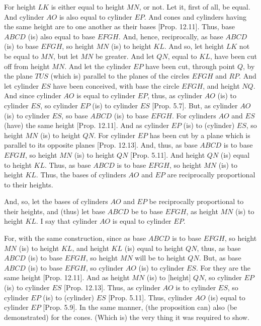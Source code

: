 \begin{Parallel}{}{}
{For height $LK$ is either equal to height $MN$, or not. Let it, first of all, be equal. And cylinder $AO$ is also equal to cylinder $EP$.
And cones and cylinders having the same height are to one another as their bases [Prop. 12.11]. 
Thus, base $ABCD$ (is) also equal to base $EFGH$. And, hence, reciprocally, as base $ABCD$ (is) to base $EFGH$,
so height $MN$ (is) to height $KL$. And so, let height $LK$ not be equal to $MN$, but let $MN$ be greater. And let $QN$, equal to
$KL$, have been cut off from height $MN$. And let the cylinder $EP$ have been cut, through point $Q$, by the plane $TUS$ (which is)
parallel to the planes of the circles $EFGH$ and $RP$. And let cylinder $ES$ have been conceived, with base the circle $EFGH$, and
height $NQ$. And since cylinder $AO$ is equal to cylinder $EP$, thus, as cylinder $AO$ (is) to cylinder $ES$, so cylinder
$EP$ (is) to cylinder $ES$ [Prop. 5.7]. But, as cylinder $AO$ (is) to cylinder $ES$, so base $ABCD$ (is)
to base $EFGH$. For cylinders $AO$ and $ES$ (have)  the same height [Prop. 12.11]. 
And as cylinder $EP$ (is) to (cylinder) $ES$, so height $MN$ (is) to height  $QN$. For cylinder $EP$
has been cut by a plane which is parallel to its opposite planes [Prop. 12.13].
And, thus, as base $ABCD$ is to base $EFGH$, so height $MN$ (is) to height $QN$ [Prop. 5.11]. And height $QN$
(is) equal to height $KL$. Thus, as base $ABCD$ is to base $EFGH$, so height $MN$ (is) to height $KL$.
Thus, the bases of cylinders $AO$ and $EP$ are reciprocally proportional to their heights.

And, so, let the bases of cylinders $AO$ and $EP$ be reciprocally proportional to their heights, and (thus) let
base $ABCD$ be to base $EFGH$, as height $MN$ (is) to height $KL$. I say that cylinder $AO$ is equal to
cylinder $EP$.

For, with the same construction, since  as base $ABCD$ is to base $EFGH$, so  height $MN$ (is) to height $KL$, and
height $KL$ (is) equal to height $QN$, thus, as base $ABCD$ (is) to base $EFGH$, so height $MN$ will be to height $QN$.
But, as base $ABCD$ (is) to base $EFGH$, so cylinder $AO$ (is) to cylinder $ES$. For they are the same height [Prop. 12.11]. 
And as height $MN$ (is) to [height] $QN$, so cylinder $EP$ (is) to cylinder $ES$ [Prop. 12.13].
Thus, as cylinder $AO$ is to cylinder $ES$, so cylinder $EP$ (is) to (cylinder) $ES$ [Prop. 5.11]. Thus, cylinder $AO$ (is)
equal to cylinder $EP$ [Prop. 5.9]. In the same manner, (the proposition can) also (be demonstrated)
for the cones. (Which is) the very thing it was required to show.}
\end{Parallel}

